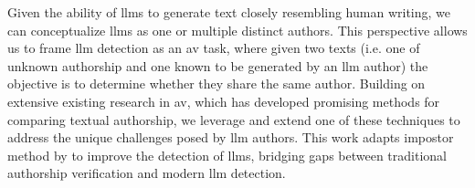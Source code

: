 Given the ability of \acp{llm} to generate text closely resembling human writing, we can conceptualize \acp{llm} as one or multiple distinct authors.
This perspective allows us to frame \ac{llm} detection as an \ac{av} task, where given two texts (i.e. one of unknown authorship and one known to be generated by an \ac{llm} author) the objective is to determine whether they share the same author.
Building on extensive existing research in \ac{av}, which has developed promising methods for comparing textual authorship, we leverage and extend one of these techniques to address the unique challenges posed by \ac{llm} authors. 
This work adapts impostor method by \citet{koppel_determining_2014} to improve the detection of \acp{llm}, bridging gaps between traditional authorship verification and modern \ac{llm} detection.

